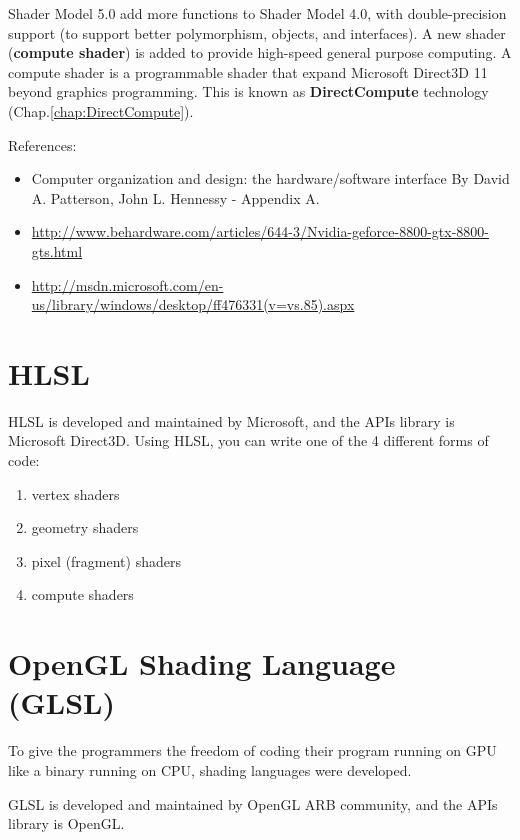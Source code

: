 Shader Model 5.0 add more functions to Shader Model 4.0, with double-precision
support (to support better polymorphism, objects, and interfaces). A new shader
({\bf compute shader}) is added to provide high-speed general purpose computing.
A compute shader is a programmable shader that expand Microsoft Direct3D 11
beyond graphics programming. This is known as {\bf DirectCompute} technology
(Chap.\ref{chap:DirectCompute}).


References:
\begin{itemize}
\item Computer organization and design: the hardware/software interface
  By David A. Patterson, John L. Hennessy - Appendix A. 
\item \url{http://www.behardware.com/articles/644-3/Nvidia-geforce-8800-gtx-8800-gts.html}
\item
\url{http://msdn.microsoft.com/en-us/library/windows/desktop/ff476331(v=vs.85).aspx}
\end{itemize}



\section{HLSL}
\label{sec:HLSL}

HLSL is developed and maintained by Microsoft, and the APIs library is Microsoft
Direct3D. Using HLSL, you can write one of the 4 different forms of code:
\begin{enumerate}
  \item vertex shaders
  \item geometry shaders
  \item pixel (fragment) shaders
  \item compute shaders
\end{enumerate}

\section{ OpenGL Shading Language (GLSL)}
\label{sec:OGSL}
\label{sec:GLSL}

To give the programmers the freedom of coding their program running on GPU like
a binary running on CPU, shading languages were developed. 

GLSL is developed and maintained by OpenGL ARB community, and the APIs library
is OpenGL. 

